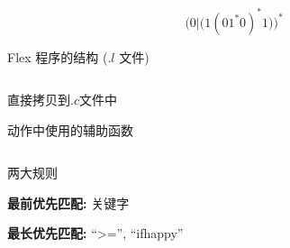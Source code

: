 \begin{frame}{}
  \[ 
    \Big(0|\big(1(01^{\ast}0)^{\ast}1\big)\Big)^{\ast} 
  \]

  \begin{center}
  \end{center}
\end{frame}

\begin{frame}{}
  \begin{center}
    Flex 程序的结构 ($.l$ 文件)
  \end{center}

  \begin{columns}
      \begin{description}
        \setlength{\itemsep}{12pt}
        \item[声明部分:] 直接拷贝到$.c$文件中
        \item[转换规则:] 
        \item[辅助函数:] 动作中使用的辅助函数
      \end{description}
  \end{columns}
\end{frame}

\begin{frame}{}
\end{frame}

\begin{frame}{}
\end{frame}

\begin{frame}{}
\end{frame}

\begin{frame}{}
\end{frame}

\begin{frame}{}
  \begin{center}
    两大规则

    \vspace{1.20cm}
    {\bf 最前优先匹配:} 关键字

    \vspace{0.60cm}
    {\bf 最长优先匹配:} ``>='', ``ifhappy''
  \end{center}
\end{frame}
